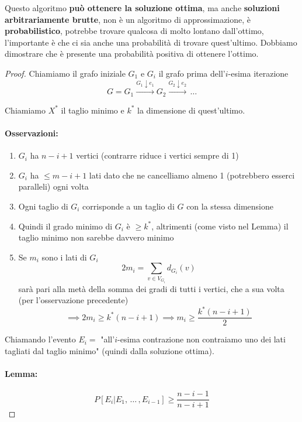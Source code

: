 Questo algoritmo \textbf{può ottenere la soluzione ottima}, ma anche \textbf{soluzioni arbitrariamente brutte}, non è un algoritmo di approssimazione, è \textbf{probabilistico}, potrebbe trovare qualcosa di molto lontano dall'ottimo, l'importante è che ci sia anche una probabilità di trovare quest'ultimo. Dobbiamo dimostrare che è presente una probabilità positiva di ottenere l'ottimo.\\

\begin{proof}
	Chiamiamo il grafo iniziale $G_1$ e $G_i$ il grafo prima dell'$i$-esima iterazione
	$$ G = G_1 \xrightarrow{G_1 \downarrow e_1} G_2 \xrightarrow{G_2 \downarrow e_2} \, \dots $$
	
	Chiamiamo $X^\ast$ il taglio minimo e $k^\ast$ la dimensione di quest'ultimo.\\
	
	\paragraph{Osservazioni:}
	\begin{enumerate}
		\item $G_i$ ha $n-i+1$ vertici (contrarre riduce i vertici sempre di 1)
		\item $G_i$ ha $\leq m -i+1$ lati dato che ne cancelliamo almeno 1 (potrebbero esserci paralleli) ogni volta
		\item Ogni taglio di $G_i$ corrisponde a un taglio di $G$ con la stessa dimensione
		\item Quindi il grado minimo di $G_i$ è $\geq k^\ast$, altrimenti (come visto nel Lemma) il taglio minimo non sarebbe davvero minimo
		\item Se $m_i$ sono i lati di $G_i$
		$$ 2 m_i = \sum_{v \in V_{G_i}} d_{G_i} (v)$$
		sarà pari alla metà della somma dei gradi di tutti i vertici, che a sua volta (per l'osservazione precedente)
		$$ \implies 2m_i \geq k^\ast (n-i+1) \implies m_i \geq \frac{k^\ast (n-i+1)}{2} $$
	\end{enumerate}
	
	Chiamando l'evento $E_i =$ "all'$i$-esima contrazione non contraiamo uno dei lati tagliati dal taglio minimo" (quindi dalla soluzione ottima).\\
	
	\newpage
	
	\paragraph{Lemma: }
	$$P[E_i | E_1, \, \dots \, , E_{i-1}] \geq \frac{n-i-1}{n-i+1}$$
	

\end{proof}
